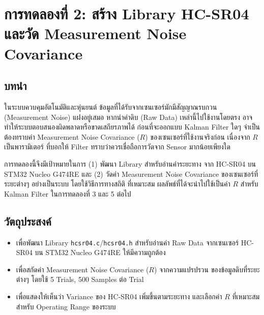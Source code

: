 
\section{การทดลองที่ 2: สร้าง Library HC-SR04 และวัด Measurement Noise Covariance}

\subsection{บทนำ}

ในระบบควบคุมอัตโนมัติและหุ่นยนต์ ข้อมูลที่ได้รับจากเซนเซอร์มักมีสัญญาณรบกวน
(Measurement Noise) แฝงอยู่เสมอ หากนำค่าดิบ (Raw Data) เหล่านี้ไปใช้งานโดยตรง
อาจทำให้ระบบตอบสนองผิดพลาดหรือขาดเสถียรภาพได้
ก่อนที่จะออกแบบ Kalman Filter ใดๆ จำเป็นต้องทราบค่า Measurement Noise
Covariance ($R$) ของเซนเซอร์ที่ใช้งานจริงก่อน เนื่องจาก $R$ เป็นพารามิเตอร์
ที่บอกให้ Filter ทราบว่าควรเชื่อถือการวัดจาก Sensor มากน้อยเพียงใด

การทดลองนี้จึงมีเป้าหมายในการ (1) พัฒนา Library สำหรับอ่านค่าระยะทาง
จาก HC-SR04 บน STM32 Nucleo G474RE และ (2) วัดค่า Measurement Noise
Covariance ของเซนเซอร์ที่ระยะต่างๆ อย่างเป็นระบบ โดยใช้วิธีการทางสถิติ
ที่เหมาะสม ผลลัพธ์ที่ได้จะนำไปใช้เป็นค่า $R$ สำหรับ Kalman Filter
ในการทดลองที่ 3 และ 5 ต่อไป

\subsection{วัตถุประสงค์}

\begin{itemize}
    \item เพื่อพัฒนา Library \texttt{hcsr04.c}/\texttt{hcsr04.h} สำหรับอ่านค่า
          Raw Data จากเซนเซอร์ HC-SR04 บน STM32 Nucleo G474RE
          ให้มีความถูกต้อง
    \item เพื่อสกัดค่า Measurement Noise Covariance ($R$) จากความแปรปรวน
          ของข้อมูลดิบที่ระยะต่างๆ โดยใช้ 5 Trials, 500 Samples ต่อ Trial
    \item เพื่อแสดงให้เห็นว่า Variance ของ HC-SR04 เพิ่มขึ้นตามระยะทาง
          และเลือกค่า $R$ ที่เหมาะสมสำหรับ Operating Range ของระบบ
\end{itemize}

